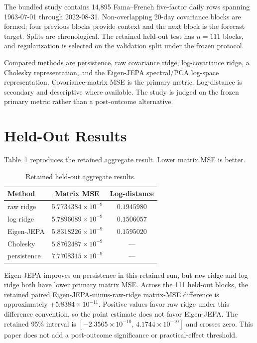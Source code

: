 \documentclass[10pt,conference]{IEEEtran}
\begin{document}
The bundled study contains 14,895 Fama--French five-factor daily rows spanning 1963-07-01 through 2022-08-31. Non-overlapping 20-day covariance blocks are formed; four previous blocks provide context and the next block is the forecast target. Splits are chronological. The retained held-out test has $n=111$ blocks, and regularization is selected on the validation split under the frozen protocol.

Compared methods are persistence, raw covariance ridge, log-covariance ridge, a Cholesky representation, and the Eigen-JEPA spectral/PCA log-space representation. Covariance-matrix MSE is the primary metric. Log-distance is secondary and descriptive where available. The study is judged on the frozen primary metric rather than a post-outcome alternative.

\section{Held-Out Results}
Table~\ref{tab:results} reproduces the retained aggregate result. Lower matrix MSE is better.

\begin{table}[t]
\centering
\caption{Retained held-out aggregate results.}
\label{tab:results}
\small
\begin{tabular}{lcc}
\toprule
Method & Matrix MSE & Log-distance \\
\midrule
raw ridge & $5.7734384\!\times\!10^{-9}$ & $0.1945980$ \\
log ridge & $5.7896089\!\times\!10^{-9}$ & $0.1506057$ \\
Eigen-JEPA & $5.8318226\!\times\!10^{-9}$ & $0.1595020$ \\
Cholesky & $5.8762487\!\times\!10^{-9}$ & --- \\
persistence & $7.7708315\!\times\!10^{-9}$ & --- \\
\bottomrule
\end{tabular}
\end{table}

Eigen-JEPA improves on persistence in this retained run, but raw ridge and log ridge both have lower primary matrix MSE. Across the 111 held-out blocks, the retained paired Eigen-JEPA-minus-raw-ridge matrix-MSE difference is approximately $+5.8384\times10^{-11}$. Positive values favor raw ridge under this difference convention, so the point estimate does not favor Eigen-JEPA. The retained 95\% interval is $[-2.3565\times10^{-10},\,4.1744\times10^{-10}]$ and crosses zero. This paper does not add a post-outcome significance or practical-effect threshold.
\end{document}

